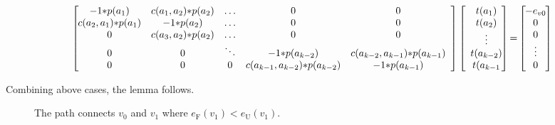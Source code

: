\documentclass[journal,10pt]{IEEEtran}
\begin{document}
\begin{IEEEproof}
\begin{itemize}
\begin{figure}
\begin{equation}
\label{eqn_violation_proof}
\left[\hspace{-2mm}
\begin{array}{c c c c c}
-1{*}p(a_1)          &   c(a_1,a_2){*}p(a_2)  &          \ldots    & 0      &   0\\
c(a_2,a_1){*}p(a_1)  &       -1{*}p(a_2)      &    \ldots    & 0      &    0\\
    0       &   c(a_3,a_2){*}p(a_2)         &    \ldots  & 0      &   0\\
    0       &   0           &         \ddots     &-1{*}p(a_{k{-}2})      &c(a_{k{-}2},a_{k{-}1}){*}p(a_{k{-}1})\\
    0       &   0           &            0    & c(a_{k{-}1},a_{k{-}2}){*}p(a_{k{-}2})     & -1{*}p(a_{k{-}1})\\
\end{array}
\right]
\left[
\begin{array}{c}
t(a_1)\\
t(a_2)\\
\vdots\\
t(a_{k{-}2})\\
t(a_{k{-}1}\\
\end{array}
\hspace{-2mm}
\right]
{=}
\left[
\hspace{-2mm}
\begin{array}{c}
-e_{v0}\\
0\\
0\\
\vdots\\
0\\
\end{array}
\hspace{-2mm}
\right]
\end{equation}
\end{figure}

\end{itemize}

Combining above cases, the lemma follows.
\end{IEEEproof}

\begin{figure}[htb]
\caption{The path connects $v_0$ and $v_1$ where $e_\text{F}(v_1){<}e_\text{U}(v_1)$.}
\label{fig_path}
\end{figure}
\end{document}
